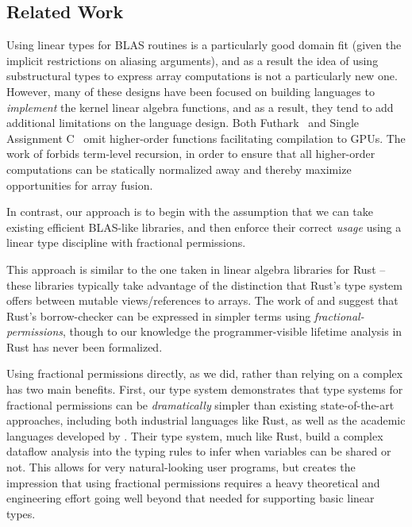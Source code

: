 \subsection{Related Work}

Using linear types for BLAS routines is a particularly good domain fit
(given the implicit restrictions on aliasing arguments), and as a
result the idea of using substructural types to express array
computations is not a particularly new
one\cite{scholz,henriksen,bernardy2016}.  However, many of these
designs have been focused on building languages to \emph{implement}
the kernel linear algebra functions, and as a result, they tend to add
additional limitations on the language design. Both
Futhark~\cite{henriksen} and Single Assignment C~\cite{scholz} omit
higher-order functions facilitating compilation to GPUs. The work of
\citet{bernardy2016} forbids term-level recursion, in order to ensure
that all higher-order computations can be statically normalized away
and thereby maximize opportunities for array fusion.

In contrast, our approach is to begin with the assumption that we can
take existing efficient BLAS-like libraries, and then enforce their
correct \emph{usage} using a linear type discipline with fractional
permissions. 


This approach is similar to the one taken in linear algebra libraries
for Rust -- these libraries typically take advantage of the
distinction that Rust's type system offers between mutable
views/references to arrays.  The work of \citet{weiss} and
\citet{rustbelt} suggest that Rust's borrow-checker can be expressed
in simpler terms using \emph{fractional-permissions}, though to our
knowledge the programmer-visible lifetime analysis in Rust has never
been formalized.

Using fractional permissions directly, as we did, rather than relying
on a complex has two main benefits. First, our type system
demonstrates that type systems for fractional permissions can be
\emph{dramatically} simpler than existing state-of-the-art approaches,
including both industrial languages like Rust, as well as the academic
languages developed by \citet{bierhoff}.  Their type system, much like
Rust, build a complex dataflow analysis into the typing rules to infer
when variables can be shared or not. This allows for very
natural-looking user programs, but creates the impression that using
fractional permissions requires a heavy theoretical and engineering
effort going well beyond that needed for supporting basic linear
types.

